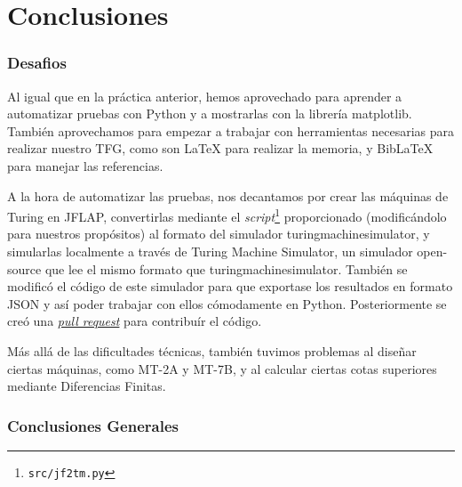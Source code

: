 \part{Conclusiones}

\section{Desafios}
Al igual que en la práctica anterior, hemos aprovechado para aprender a automatizar pruebas con Python y a mostrarlas con la librería matplotlib\parencite{matplotlib}. También aprovechamos para empezar a trabajar con herramientas necesarias para realizar nuestro TFG, como son \LaTeX\parencite{latex} para realizar la memoria, y BibLaTeX\parencite{biblatex} para manejar las referencias.\medskip

A la hora de automatizar las pruebas, nos decantamos por crear las máquinas de Turing en JFLAP\parencite{jflap}, convertirlas mediante el \textit{script}\footnote{\texttt{src/jf2tm.py}} proporcionado (modificándolo para nuestros propósitos) al formato del simulador turingmachinesimulator\parencite{turingmachinesimulator}, y simularlas localmente a través de Turing Machine Simulator\parencite{tmsimulator}, un simulador open-source que lee el mismo formato que turingmachinesimulator. También se modificó el código de este simulador para que exportase los resultados en formato JSON\parencite{json} y así poder trabajar con ellos cómodamente en Python. Posteriormente se creó una \href{https://github.com/fcortes/turing-machine-simulator/pull/2}{\textit{pull request}} para contribuír el código.\medskip

Más allá de las dificultades técnicas, también tuvimos problemas al diseñar ciertas máquinas, como MT-2A y MT-7B, y al calcular ciertas cotas superiores mediante Diferencias Finitas.


\section{Conclusiones Generales}



\newpage